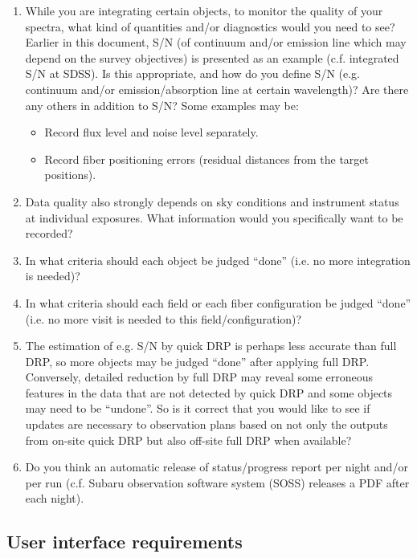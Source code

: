 \documentclass[a4paper,notitlepage]{article}
\begin{document}
\begin{enumerate}
 \item[\cols{a}] While you are integrating certain objects, to monitor the
      quality of your spectra, what kind of quantities and/or
      diagnostics would you need to see? Earlier in this document,
      S/N (of continuum and/or emission line which may depend on the
      survey objectives) is presented as an example (c.f. integrated
      S/N at SDSS). Is this appropriate, and how do you define S/N 
      (e.g. continuum and/or emission/absorption line at certain wavelength)? 
      Are there any others in
      addition to S/N? Some examples may be:
      \begin{itemize}
       \item Record flux level and noise level separately.
       \item Record fiber positioning errors (residual distances
         from the target positions).
      \end{itemize}
 \item[\colm{b}] Data quality also strongly depends on sky conditions and
      instrument status at individual exposures. What information
      would you specifically want to be recorded?
 \item[\cols{c}] In what criteria should each object be judged ``done''
      (i.e. no more integration is needed)?
 \item[\cols{d}] In what criteria should each field or each fiber configuration
      be judged ``done'' (i.e. no more visit is needed to this
      field/configuration)?
 \item[\cols{e}] The estimation of e.g. S/N by quick DRP is perhaps less
      accurate than full DRP, so more objects may be judged ``done''
      after applying full DRP. Conversely, detailed reduction by
      full DRP may reveal some erroneous features in the data that
      are not detected by quick DRP and some objects may need to be
      ``undone''. So is it correct that you would like to see if
      updates are necessary to observation plans based on not only
      the outputs from on-site quick DRP but also off-site full DRP
      when available?
 \item[\cols{f}] Do you think an automatic release of status/progress
          report per night and/or per run (c.f. Subaru observation
          software system (SOSS) releases a PDF after each night).
\end{enumerate}

\subsection{User interface requirements}
\end{document}

